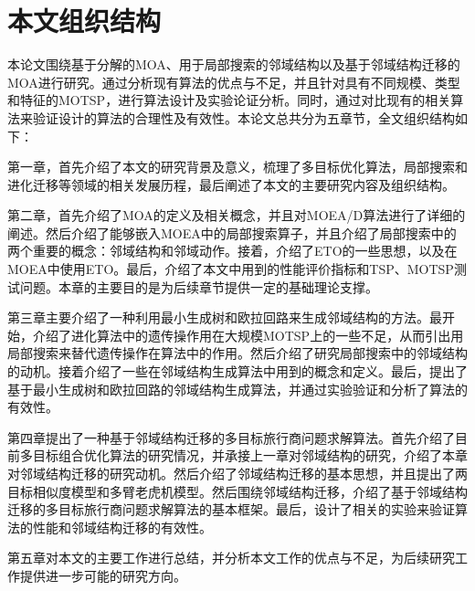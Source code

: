 \section{本文组织结构}

本论文围绕基于分解的MOA、用于局部搜索的邻域结构以及基于邻域结构迁移的MOA进行研究。通过分析现有算法的优点与不足，并且针对具有不同规模、类型和特征的MOTSP，进行算法设计及实验论证分析。同时，通过对比现有的相关算法来验证设计的算法的合理性及有效性。本论文总共分为五章节，全文组织结构如下：
\par
第一章，首先介绍了本文的研究背景及意义，梳理了多目标优化算法，局部搜索和进化迁移等领域的相关发展历程，最后阐述了本文的主要研究内容及组织结构。
\par
第二章，首先介绍了MOA的定义及相关概念，并且对MOEA/D算法进行了详细的阐述。然后介绍了能够嵌入MOEA中的局部搜索算子，并且介绍了局部搜索中的两个重要的概念：邻域结构和邻域动作。接着，介绍了ETO的一些思想，以及在MOEA中使用ETO。最后，介绍了本文中用到的性能评价指标和TSP、MOTSP测试问题。本章的主要目的是为后续章节提供一定的基础理论支撑。
\par
第三章主要介绍了一种利用最小生成树和欧拉回路来生成邻域结构的方法。最开始，介绍了进化算法中的遗传操作用在大规模MOTSP上的一些不足，从而引出用局部搜索来替代遗传操作在算法中的作用。然后介绍了研究局部搜索中的邻域结构的动机。接着介绍了一些在邻域结构生成算法中用到的概念和定义。最后，提出了基于最小生成树和欧拉回路的邻域结构生成算法，并通过实验验证和分析了算法的有效性。
\par
第四章提出了一种基于邻域结构迁移的多目标旅行商问题求解算法。首先介绍了目前多目标组合优化算法的研究情况，并承接上一章对邻域结构的研究，介绍了本章对邻域结构迁移的研究动机。然后介绍了邻域结构迁移的基本思想，并且提出了两目标相似度模型和多臂老虎机模型。然后围绕邻域结构迁移，介绍了基于邻域结构迁移的多目标旅行商问题求解算法的基本框架。最后，设计了相关的实验来验证算法的性能和邻域结构迁移的有效性。
\par
第五章对本文的主要工作进行总结，并分析本文工作的优点与不足，为后续研究工作提供进一步可能的研究方向。